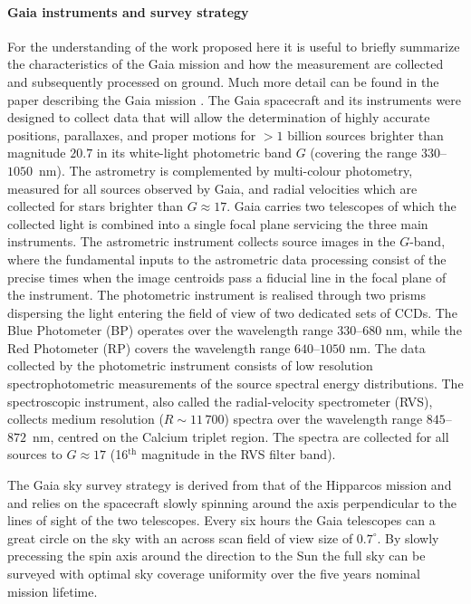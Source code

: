 \paragraph{Gaia instruments and survey strategy} For the understanding of the work proposed here it is useful to briefly summarize the characteristics of the Gaia mission and how the measurement are collected and subsequently processed on ground. Much more detail can be found in the paper describing the Gaia mission \cite{2016A&A...595A...1G}. The Gaia spacecraft and its instruments were designed to collect data that will allow the determination of highly accurate positions, parallaxes, and proper motions for $>1$ billion sources brighter than magnitude $20.7$ in its white-light photometric band $G$ (covering the range $330$--$1050$~nm). The astrometry is complemented by multi-colour photometry, measured for all sources observed by Gaia, and radial velocities which are collected for stars brighter than $G\approx17$. Gaia carries two telescopes of which the collected light is combined into a single focal plane servicing the three main instruments. The astrometric instrument collects source images in the $G$-band, where the fundamental inputs to the astrometric data processing consist of the precise times when the image centroids pass a fiducial line in the focal plane of the instrument. The photometric instrument is realised through two prisms dispersing the light entering the field of view of two dedicated sets of CCDs. The Blue Photometer (BP) operates over the wavelength range $330$--$680$ nm, while the Red Photometer (RP) covers the wavelength range $640$--$1050$ nm. The data collected by the photometric instrument consists of low resolution spectrophotometric measurements of the source spectral energy distributions. The spectroscopic instrument, also called the radial-velocity spectrometer (RVS), collects medium resolution ($R\sim11\,700$) spectra over the wavelength range $845$--$872$~nm, centred on the Calcium triplet region. The spectra are collected for all sources to $G\approx17$ (16$^\text{th}$ magnitude in the RVS filter band).

The Gaia sky survey strategy is derived from that of the Hipparcos mission and and relies on the spacecraft slowly spinning around the axis perpendicular to the lines of sight of the two telescopes. Every six hours the Gaia telescopes can a great circle on the sky with an across scan field of view size of $0.7^\circ$. By slowly precessing the spin axis around the direction to the Sun the full sky can be surveyed with optimal sky coverage uniformity over the five years nominal mission lifetime. 


